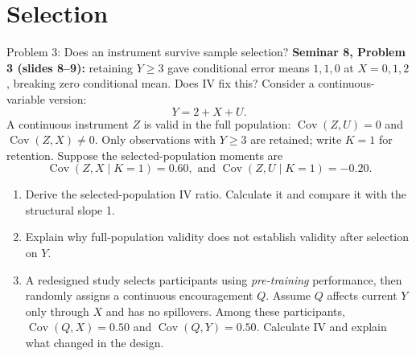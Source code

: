 \documentclass[notes,10pt, aspectratio=169]{beamer}
\newif\ifshowsolutions
\newcommand{\Var}{\operatorname{Var}}
\newcommand{\Cov}{\operatorname{Cov}}
\newcommand{\answerpart}[1]{\textcolor{blue}{\textbf{#1.}}\,}
\begin{document}
\ifshowsolutions
\begin{frame}{Solution 2: Instrument the recorded regressor}
\small
\setlength{\abovedisplayskip}{4pt}
\setlength{\belowdisplayskip}{4pt}
\answerpart{1}Substitute $X=\widetilde X-V$:
\[
Y=40+3\widetilde X+\widetilde U,\text{ where }\widetilde U=U-3V.
\]
\[
\Cov(\widetilde X,\widetilde U)=-3\Var(V)=-6,
\text{ and }b_{\mathrm{OLS}}=3\frac4{4+2}=\boxed2.
\]
\answerpart{2}The instrument isolates true-hour variation rather than recording noise:
\[
\begin{aligned}
\Cov(Z,\widetilde X)&=\Cov(Z,X)+\Cov(Z,V)=1.5,\\
\Cov(Z,\widetilde U)&=\Cov(Z,U)-3\Cov(Z,V)=0,\\
\Cov(Z,Y)&=3\Cov(Z,X)+\Cov(Z,U)=4.5.
\end{aligned}
\]
\answerpart{3}Consequently,
\[
b_{\mathrm{IV}}=\frac{\Cov(Z,Y)}{\Cov(Z,\widetilde X)}
=\frac{4.5}{1.5}=\boxed{3\text{ points per true practice hour}}.
\]
First regress recorded hours $\widetilde X$ on an intercept and $Z$. Then regress $Y$ on an intercept and the fitted recorded hours. The population first-stage slope is 1.5, the reduced-form slope is 4.5, and their ratio is 3.
\par\smallskip
If $\Cov(Z,V)\ne0$, then $\Cov(Z,\widetilde U)=-3\Cov(Z,V)\ne0$: the instrument would be invalid under the other maintained assumptions.
\end{frame}
\fi

\section{Selection}
\begin{frame}{Problem 3: Does an instrument survive sample selection?}
\small
\setlength{\abovedisplayskip}{4pt}
\setlength{\belowdisplayskip}{4pt}
\textbf{Seminar 8, Problem 3 (slides 8--9):} retaining $Y\geq3$ gave conditional error means $1,1,0$ at $X=0,1,2$, breaking zero conditional mean. Does IV fix this? Consider a continuous-variable version:
\[
Y=2+X+U.
\]
A continuous instrument $Z$ is valid in the full population: $\Cov(Z,U)=0$ and $\Cov(Z,X)\ne0$. Only observations with $Y\geq3$ are retained; write $K=1$ for retention. Suppose the selected-population moments are
\[
\Cov(Z,X\mid K=1)=0.60,\text{ and }\Cov(Z,U\mid K=1)=-0.20.
\]
\begin{enumerate}
\item Derive the selected-population IV ratio. Calculate it and compare it with the structural slope 1.
\item Explain why full-population validity does not establish validity after selection on $Y$.
\item A redesigned study selects participants using \emph{pre-training} performance, then randomly assigns a continuous encouragement $Q$. Assume $Q$ affects current $Y$ only through $X$ and has no spillovers. Among these participants, $\Cov(Q,X)=0.50$ and $\Cov(Q,Y)=0.50$. Calculate IV and explain what changed in the design.
\end{enumerate}
\end{frame}
\end{document}
